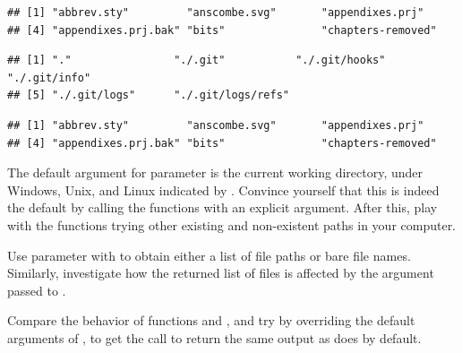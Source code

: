 \documentclass[krantz2]{krantz}\usepackage{knitr}
\begin{document}
\begin{knitrout}\footnotesize
{}\color{fgcolor}\begin{kframe}
\begin{alltt}
\hlstd{(}\hlstd{())}
\end{alltt}
\begin{verbatim}
## [1] "abbrev.sty"         "anscombe.svg"       "appendixes.prj"
## [4] "appendixes.prj.bak" "bits"               "chapters-removed"
\end{verbatim}
\begin{alltt}
\hlstd{(}\hlstd{())}
\end{alltt}
\begin{verbatim}
## [1] "."                "./.git"           "./.git/hooks"     "./.git/info"
## [5] "./.git/logs"      "./.git/logs/refs"
\end{verbatim}
\begin{alltt}
\hlstd{(}\hlstd{())}
\end{alltt}
\begin{verbatim}
## [1] "abbrev.sty"         "anscombe.svg"       "appendixes.prj"
## [4] "appendixes.prj.bak" "bits"               "chapters-removed"
\end{verbatim}
\end{kframe}
\end{knitrout}

\begin{playground}
The default argument for parameter  is the current working directory, under Windows, Unix, and Linux indicated by . Convince yourself that this is indeed the default by calling the functions with an explicit argument. After this, play with the functions trying other existing and non-existent paths in your computer.
\end{playground}

\begin{playground}
Use parameter  with  to obtain either a list of file paths or bare file names. Similarly, investigate how the returned list of files is affected by the argument passed to .
\end{playground}

\begin{playground}
Compare the behavior of functions  and , and try by overriding the default arguments of , to get the call to return the same output as  does by default.
\end{playground}
\end{document}
